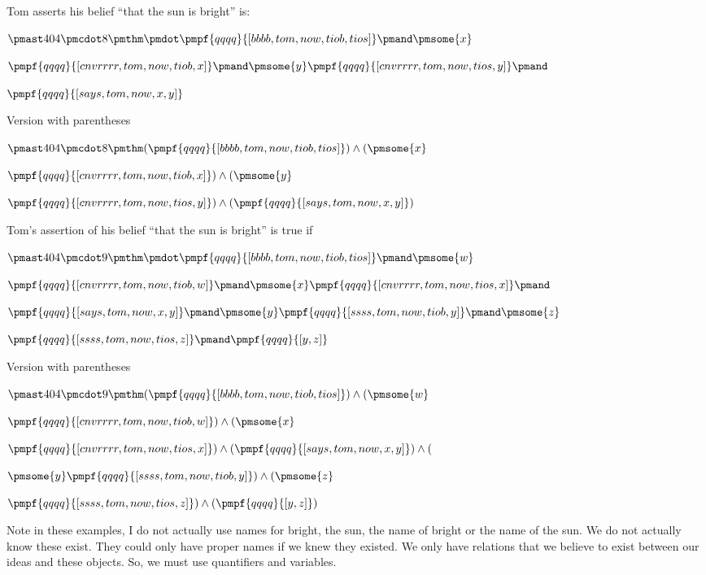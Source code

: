 \documentclass[12pt]{article}
\begin{document}
Tom asserts his belief “that the sun is bright”  is:

$\pmast 404 \pmcdot 8 \pmthm \pmdot \pmpf{qqqq}{[bbbb, tom, now, tiob, tios]} \pmand \pmsome{x} $

$\pmpf{qqqq}{[cnvrrrr, tom, now, tiob, x]} \pmand \pmsome{y} \pmpf{qqqq}{[cnvrrrr, tom, now, tios, y]} \pmand $

$\pmpf{qqqq}{[says, tom, now, x, y]}$
 
 

Version with parentheses

$\pmast 404 \pmcdot 8 \pmthm  (  \pmpf{qqqq}{[bbbb, tom, now, tiob, tios]} ) \land ( \pmsome{x} $

$\pmpf{qqqq}{[cnvrrrr, tom, now, tiob, x]} ) \land ( \pmsome{y} $

$\pmpf{qqqq}{[cnvrrrr, tom, now, tios, y]} ) \land ( \pmpf{qqqq}{[says, tom, now, x, y]})$


Tom's assertion of his belief “that the sun is bright”  is true if

$\pmast 404 \pmcdot 9 \pmthm \pmdot \pmpf{qqqq}{[bbbb, tom, now, tiob, tios]} \pmand \pmsome{w} $

$\pmpf{qqqq}{[cnvrrrr, tom, now, tiob, w]} \pmand \pmsome{x} \pmpf{qqqq}{[cnvrrrr, tom, now, tios, x]} \pmand $

$\pmpf{qqqq}{[says, tom, now, x, y]} \pmand \pmsome{y} \pmpf{qqqq}{[ssss, tom, now, tiob, y]} \pmand \pmsome{z} $

$\pmpf{qqqq}{[ssss, tom, now, tios, z]} \pmand \pmpf{qqqq}{[y,z]}$
 
 

Version with parentheses

$\pmast 404 \pmcdot 9 \pmthm  (  \pmpf{qqqq}{[bbbb, tom, now, tiob, tios]} ) \land ( \pmsome{w} $

$\pmpf{qqqq}{[cnvrrrr, tom, now, tiob, w]}) \land ( \pmsome{x} $

$\pmpf{qqqq}{[cnvrrrr, tom, now, tios, x]}) \land ( \pmpf{qqqq}{[says, tom, now, x, y]} ) \land ( $

$\pmsome{y} \pmpf{qqqq}{[ssss, tom, now, tiob, y]} ) \land ( \pmsome{z} $

$\pmpf{qqqq}{[ssss, tom, now, tios, z]} ) \land ( \pmpf{qqqq}{[y,z]})$


Note in these examples, I do not actually use names for bright, the sun, the name of bright or the name of the sun. We do not actually know these exist. They could only have proper names if we knew they existed. We only have relations that we believe to exist between our ideas and these objects. So, we must use quantifiers and variables.
\end{document}
